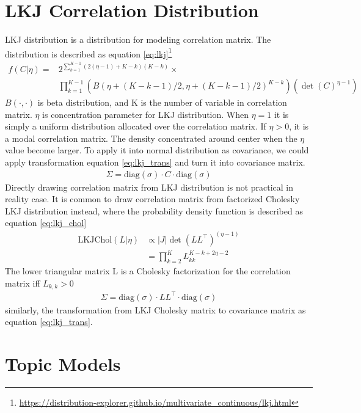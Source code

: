 \section{LKJ Correlation Distribution} \label{ch2:lkj}
LKJ distribution \cite{lewandowski_generating_2009} is a distribution for modeling correlation matrix. The distribution is described as equation \ref{eq:lkj}\footnote{\url{https://distribution-explorer.github.io/multivariate_continuous/lkj.html}}
\begin{align} \label{eq:lkj}
f(C|\eta)=&2^{\sum_{k=1}^{K-1}(2(\eta-1)+K-k)(K-k)}\times\\
&\prod_{k=1}^{K-1}(B(\eta+(K-k-1)/2,\eta+(K-k-1)/2)^{K-k})(\det(C)^{\eta-1})
\end{align}
$ B(\cdot,\cdot) $ is beta distribution, and K is the number of variable in correlation matrix. $ \eta $ is concentration parameter for LKJ distribution. When $ \eta=1 $ it is simply a uniform distribution allocated over the correlation matrix. If $ \eta>0 $, it is a modal correlation matrix. The density concentrated around center when the $ \eta $ value become larger.
To apply it into normal distribution as covariance, we could apply transformation equation \ref{eq:lkj_trans} and turn it into covariance matrix\cite{barnard_modeling_2000}.
\begin{align}\label{eq:lkj_trans}
\Sigma=\text{diag}(\sigma)\cdot C \cdot \text{diag}(\sigma)
\end{align}
Directly drawing correlation matrix from LKJ distribution is not practical in reality case. It is common to draw correlation matrix from factorized Cholesky LKJ distribution instead, where the probability density function is described as equation \ref{eq:lkj_chol}
\begin{align} \label{eq:lkj_chol}
\text{LKJChol}(L|\eta)&\propto|J|\det(LL^\top)^{(\eta-1)}\\
&=\prod_{k=2}^{K}L_{kk}^{K-k+2\eta-2}
\end{align}
The lower triangular matrix L is a Cholesky factorization for the correlation matrix iff $ L_{k,k}>0 $
\begin{align}
\Sigma=\text{diag}(\sigma)\cdot LL^\top \cdot \text{diag}(\sigma)
\end{align}
similarly, the transformation from LKJ Cholesky matrix to covariance matrix as equation \ref{eq:lkj_trans}.
\section{Topic Models}
